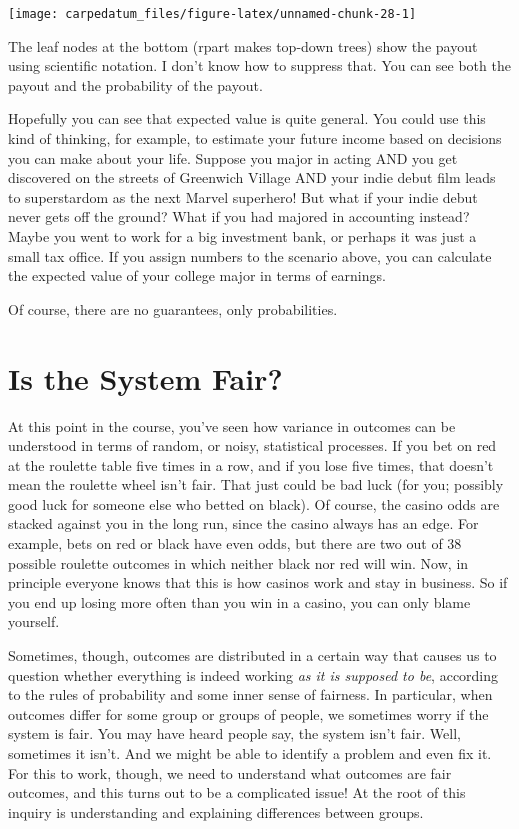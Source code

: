 \documentclass[openany]{book}
\begin{document}
\begin{center}\texttt{[image: carpedatum\_files/figure-latex/unnamed-chunk-28-1]} \end{center}

The leaf nodes at the bottom (rpart makes top-down trees) show the payout using scientific notation. I don't know how to suppress that. You can see both the payout and the probability of the payout.

Hopefully you can see that expected value is quite general. You could use this kind of thinking, for example, to estimate your future income based on decisions you can make about your life. Suppose you major in acting AND you get discovered on the streets of Greenwich Village AND your indie debut film leads to superstardom as the next Marvel superhero! But what if your indie debut never gets off the ground? What if you had majored in accounting instead? Maybe you went to work for a big investment bank, or perhaps it was just a small tax office. If you assign numbers to the scenario above, you can calculate the expected value of your college major in terms of earnings.

Of course, there are no guarantees, only probabilities.

\hypertarget{is-the-system-fair}{%
\chapter*{Is the System Fair?}\label{is-the-system-fair}}

At this point in the course, you've seen how variance in outcomes can be understood in terms of random, or noisy, statistical processes. If you bet on red at the roulette table five times in a row, and if you lose five times, that doesn't mean the roulette wheel isn't fair. That just could be bad luck (for you; possibly good luck for someone else who betted on black). Of course, the casino odds are stacked against you in the long run, since the casino always has an edge. For example, bets on red or black have even odds, but there are two out of 38 possible roulette outcomes in which neither black nor red will win. Now, in principle everyone knows that this is how casinos work and stay in business. So if you end up losing more often than you win in a casino, you can only blame yourself.

Sometimes, though, outcomes are distributed in a certain way that causes us to question whether everything is indeed working \emph{as it is supposed to be}, according to the rules of probability and some inner sense of fairness. In particular, when outcomes differ for some group or groups of people, we sometimes worry if the system is fair. You may have heard people say, the system isn't fair. Well, sometimes it isn't. And we might be able to identify a problem and even fix it. For this to work, though, we need to understand what outcomes are fair outcomes, and this turns out to be a complicated issue! At the root of this inquiry is understanding and explaining differences between groups.
\end{document}
